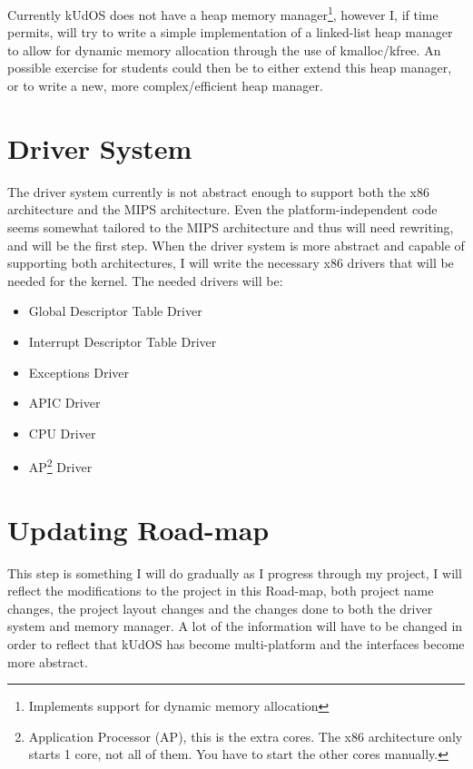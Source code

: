 Currently kUdOS does not have a heap memory manager\footnote{Implements support for dynamic memory allocation}, however I, if time permits, will try to write a simple implementation of a linked-list heap manager to allow for dynamic memory allocation through the use of kmalloc/kfree. An possible exercise for students could then be to either extend this heap manager, or to write a new, more complex/efficient heap manager.

\section{Driver System}

The driver system currently is not abstract enough to support both the x86 architecture and the MIPS architecture. Even the platform-independent code seems somewhat tailored to the MIPS architecture and thus will need rewriting, and will be the first step. When the driver system is more abstract and capable of supporting both architectures, I will write the necessary x86 drivers that will be needed for the kernel. The needed drivers will be:
\begin{itemize}
 \item Global Descriptor Table Driver
 \item Interrupt Descriptor Table Driver
 \item Exceptions Driver
 \item APIC Driver
 \item CPU Driver
 \item AP\footnote{Application Processor (AP), this is the extra cores. The x86 architecture only starts 1 core, not all of them. You have to start the other cores manually.} Driver
\end{itemize}

\section{Updating Road-map}

This step is something I will do gradually as I progress through my project, I will reflect the modifications to the project in this Road-map, both project name changes, the project layout changes and the changes done to both the driver system and memory manager. A lot of the information will have to be changed in order to reflect that kUdOS has become multi-platform and the interfaces become more abstract. 


